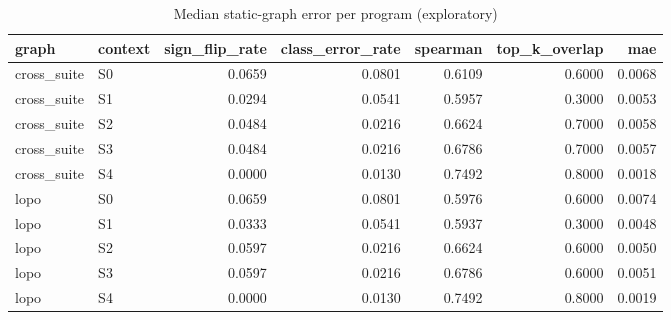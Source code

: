 \begin{table}[t]
\centering
\caption{Median static-graph error per program (exploratory)}
\label{tab:v3-1-static-graph-error}
\begin{tabular}{llrrrrr}
\toprule
graph & context & sign\_flip\_rate & class\_error\_rate & spearman & top\_k\_overlap & mae \\
\midrule
cross\_suite & S0 & 0.0659 & 0.0801 & 0.6109 & 0.6000 & 0.0068 \\
cross\_suite & S1 & 0.0294 & 0.0541 & 0.5957 & 0.3000 & 0.0053 \\
cross\_suite & S2 & 0.0484 & 0.0216 & 0.6624 & 0.7000 & 0.0058 \\
cross\_suite & S3 & 0.0484 & 0.0216 & 0.6786 & 0.7000 & 0.0057 \\
cross\_suite & S4 & 0.0000 & 0.0130 & 0.7492 & 0.8000 & 0.0018 \\
lopo & S0 & 0.0659 & 0.0801 & 0.5976 & 0.6000 & 0.0074 \\
lopo & S1 & 0.0333 & 0.0541 & 0.5937 & 0.3000 & 0.0048 \\
lopo & S2 & 0.0597 & 0.0216 & 0.6624 & 0.6000 & 0.0050 \\
lopo & S3 & 0.0597 & 0.0216 & 0.6786 & 0.6000 & 0.0051 \\
lopo & S4 & 0.0000 & 0.0130 & 0.7492 & 0.8000 & 0.0019 \\
\bottomrule
\end{tabular}
\end{table}
